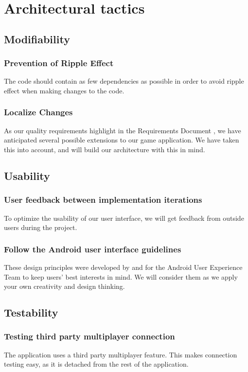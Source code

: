 \pagebreak

\section{Architectural tactics}

\subsection{Modifiability}                       

\subsubsection{Prevention of Ripple Effect}
The code should contain as few dependencies as possible in order to avoid ripple effect when making changes to the code.

\subsubsection{Localize Changes}
As our quality requirements highlight in the Requirements Document \cite{requirement}, we have anticipated several possible extensions to our game application. We have taken this into account, and will build our architecture with this in mind.

\subsection{Usability}

\subsubsection{User feedback between implementation iterations}
To optimize the usability of our user interface, we will get feedback from outside users during the project.

\subsubsection{Follow the Android user interface guidelines} 
These design principles were developed by and for the Android User Experience Team to keep users' best interests in mind. We will consider them as we apply your own creativity and design thinking.

\subsection{Testability}
\subsubsection{Testing third party multiplayer connection}
The application uses a third party multiplayer feature. This makes connection testing easy, as it is detached from the rest of the application.